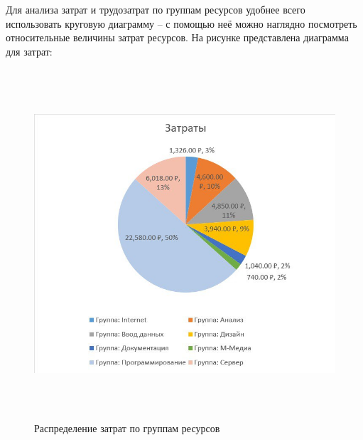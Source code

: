 Для анализа затрат и трудозатрат по группам ресурсов удобнее всего использовать круговую диаграмму -- с помощью неё можно наглядно посмотреть относительные величины затрат ресурсов.
На рисунке представлена диаграмма для затрат:
\FloatBarrier
\begin{figure}[h]	
	\begin{center}
		\includegraphics[width=\linewidth, height=13cm]{inc/4-1.jpg}
	\end{center}
	\captionsetup{justification=centering}
	\caption{Распределение затрат по группам ресурсов}
\end{figure}
\FloatBarrier

